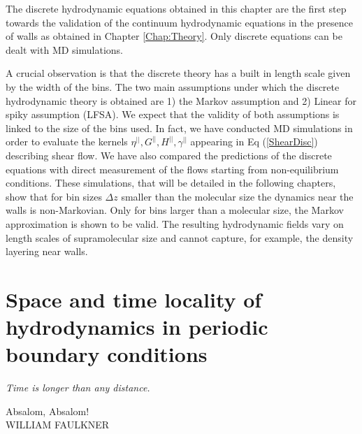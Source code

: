 \documentclass[b5paper,openright,11pt]{book}
\begin{document}
The discrete hydrodynamic equations obtained  in this chapter are
the first  step towards the  validation of the  continuum hydrodynamic
equations    in   the    presence    of   walls    as   obtained    in Chapter \ref{Chap:Theory}. Only discrete equations  can be dealt with MD
simulations. 

A  crucial observation  is that  the discrete  theory has  a built  in
length scale given by the width of the bins.  The two main assumptions
under which  the discrete hydrodynamic  theory is obtained are  1) the
Markov  assumption and  2)  Linear for  spiky  assumption (LFSA).   We
expect that the validity of both  assumptions is linked to the size of
the bins used.  In fact, we  have conducted MD simulations in order to
evaluate  the kernels  $\eta^{||},G^{||},H^{||},\gamma^{||}$ appearing
in Eq (\ref{ShearDisc})  describing shear flow. We  have also compared
the predictions of  the discrete equations with  direct measurement of
the   flows   starting   from   non-equilibrium   conditions.    These
simulations, that will  be detailed in the following chapters, show that
for bin sizes $\Delta z$ smaller  than the molecular size the dynamics
near the walls is non-Markovian. Only for bins larger than a molecular
size,  the  Markov   approximation  is  shown  to   be  valid. 
The resulting  hydrodynamic fields vary on length  scales of supramolecular size and  cannot capture, for example, the density layering near walls.




\chapter{Space and time locality of hydrodynamics in periodic boundary conditions}\label{Chap:PBC}
\epigraph{\textit{Time is longer than any distance.}}{Absalom, Absalom! \\ WILLIAM FAULKNER}
\end{document}
